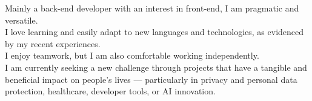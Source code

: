 \documentclass[8pt]{developercv} %
\begin{document}
\begin{minipage}[t]{0.51\textwidth} %
	\vspace{-0.5\baselineskip} %

	Mainly a back-end developer with an interest in front-end, I am pragmatic and versatile.\\
	I love learning and easily adapt to new languages and technologies, as evidenced by my recent experiences.\\
	I enjoy teamwork, but I am also comfortable working independently.\\

	I am currently seeking a new challenge through projects that have a tangible and beneficial impact on people's lives — particularly in privacy and personal data protection, healthcare, developer tools, or AI innovation.
\end{minipage}
\hfill %
\begin{minipage}[t]{0.45\textwidth} %
	\vspace{-1.5\baselineskip} %
	\begin{barchart}{5.5}
	\end{barchart}
\end{minipage}

\vfill %
\end{document}
